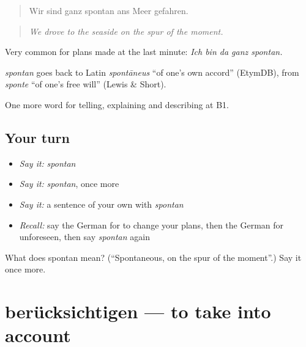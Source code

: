 \begin{quote}
Wir sind ganz spontan ans Meer gefahren.
\end{quote}

\begin{quote}
\emph{We drove to the seaside on the spur of the moment.}
\end{quote}

Very common for plans made at the last minute: \emph{Ich bin da ganz spontan.}

\begin{cousinweb}
\emph{spontan} goes back to Latin \emph{spontāneus} \textquotedblleft{}of one's own accord\textquotedblright{} (EtymDB), from \emph{sponte} \textquotedblleft{}of one's free will\textquotedblright{} (Lewis \& Short).
\end{cousinweb}

\begin{grammarlens}[title={What you've built}]
One more word for telling, explaining and describing at B1.
\end{grammarlens}

\subsection*{Your turn}
\begin{itemize}
\raggedright
  \item \emph{Say it:} \emph{spontan}
  \item \emph{Say it:} \emph{spontan}, once more
  \item \emph{Say it:} a sentence of your own with \emph{spontan}
  \item \emph{Recall:} say the German for to change your plans, then the German for unforeseen, then say \emph{spontan} again
\end{itemize}

\begin{tcolorbox}[breakable,colback=teal!4,colframe=teal!35!black,title={Before you move on}]
What does spontan mean? (\textquotedblleft{}Spontaneous, on the spur of the moment\textquotedblright{}.) Say it once more.
\end{tcolorbox}
\section[berücksichtigen]{berücksichtigen — to take into account}

\label{lesson:GE-C373-beruecksichtigen}



